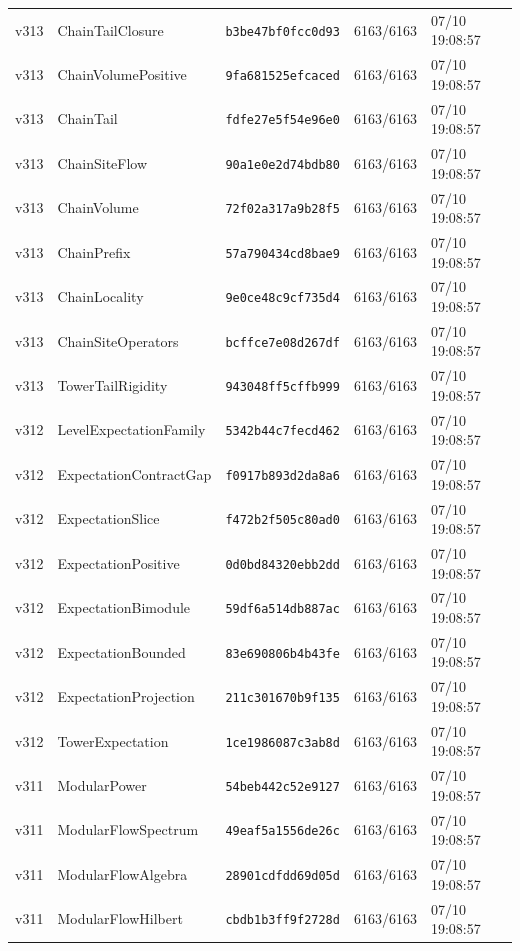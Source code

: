 \documentclass[11pt]{article}
\theoremstyle{definition}\newtheorem{deriv}{Derivação}
\begin{document}
{\begin{longtable}{@{}lllll@{}}
v313 & ChainTailClosure & \texttt{b3be47bf0fcc0d93} & 6163/6163 & 07/10 19:08:57 \\
v313 & ChainVolumePositive & \texttt{9fa681525efcaced} & 6163/6163 & 07/10 19:08:57 \\
v313 & ChainTail & \texttt{fdfe27e5f54e96e0} & 6163/6163 & 07/10 19:08:57 \\
v313 & ChainSiteFlow & \texttt{90a1e0e2d74bdb80} & 6163/6163 & 07/10 19:08:57 \\
v313 & ChainVolume & \texttt{72f02a317a9b28f5} & 6163/6163 & 07/10 19:08:57 \\
v313 & ChainPrefix & \texttt{57a790434cd8bae9} & 6163/6163 & 07/10 19:08:57 \\
v313 & ChainLocality & \texttt{9e0ce48c9cf735d4} & 6163/6163 & 07/10 19:08:57 \\
v313 & ChainSiteOperators & \texttt{bcffce7e08d267df} & 6163/6163 & 07/10 19:08:57 \\
v313 & TowerTailRigidity & \texttt{943048ff5cffb999} & 6163/6163 & 07/10 19:08:57 \\
v312 & LevelExpectationFamily & \texttt{5342b44c7fecd462} & 6163/6163 & 07/10 19:08:57 \\
v312 & ExpectationContractGap & \texttt{f0917b893d2da8a6} & 6163/6163 & 07/10 19:08:57 \\
v312 & ExpectationSlice & \texttt{f472b2f505c80ad0} & 6163/6163 & 07/10 19:08:57 \\
v312 & ExpectationPositive & \texttt{0d0bd84320ebb2dd} & 6163/6163 & 07/10 19:08:57 \\
v312 & ExpectationBimodule & \texttt{59df6a514db887ac} & 6163/6163 & 07/10 19:08:57 \\
v312 & ExpectationBounded & \texttt{83e690806b4b43fe} & 6163/6163 & 07/10 19:08:57 \\
v312 & ExpectationProjection & \texttt{211c301670b9f135} & 6163/6163 & 07/10 19:08:57 \\
v312 & TowerExpectation & \texttt{1ce1986087c3ab8d} & 6163/6163 & 07/10 19:08:57 \\
v311 & ModularPower & \texttt{54beb442c52e9127} & 6163/6163 & 07/10 19:08:57 \\
v311 & ModularFlowSpectrum & \texttt{49eaf5a1556de26c} & 6163/6163 & 07/10 19:08:57 \\
v311 & ModularFlowAlgebra & \texttt{28901cdfdd69d05d} & 6163/6163 & 07/10 19:08:57 \\
v311 & ModularFlowHilbert & \texttt{cbdb1b3ff9f2728d} & 6163/6163 & 07/10 19:08:57 \\

\end{longtable}}
\end{document}
